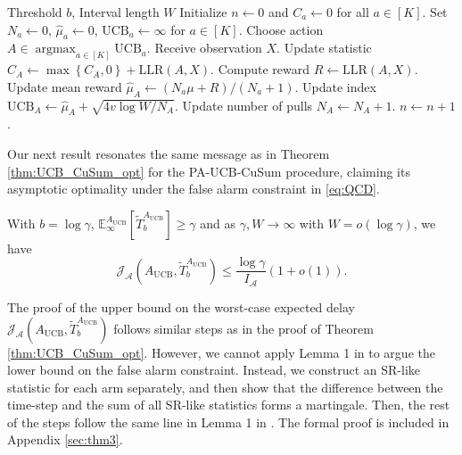 \documentclass[letterpaper, 10 pt, conference]{ieeeconf}  %
\newcommand{\lp}{\left(}
\newcommand{\rp}{\right)}
\newcommand{\lb}{\left[}
\newcommand{\rb}{\right]}
\newcommand{\lbp}{\left\{}
\newcommand{\rbp}{\right\}}
\newcommand{\mcal}{\mathcal}
\newcommand{\mrm}{\mathrm}
\newcommand{\E}{\mathbb{E}}
\newcommand{\argmax}{\mathop{\mathrm{argmax}}}
\begin{document}
\begin{algorithm}[htb]
  \caption{PA-UCB-CuSum Procedure}
  \label{alg:PA_UCB_CuSum}
  \begin{algorithmic}
     Threshold $b$, Interval length $W$
    \STATE Initialize $n \leftarrow 0$ and $C_{a} \leftarrow 0$ for all $a \in \lb K \rb$.
    \REPEAT
    \STATE Set $N_{a} \leftarrow 0$, $\hat{\mu}_{a} \leftarrow 0$, $\mrm{UCB}_{a} \leftarrow \infty$ for $a \in \lb K \rb$.
    \ENDIF
    \STATE Choose action $A \in \argmax_{a \in \lb K \rb} \mrm{UCB}_{a}$.
    \STATE Receive observation $X$.
    \STATE Update statistic $C_{A} \leftarrow \max\lbp C_{A}, 0 \rbp + \mrm{LLR}\lp A, X \rp$.
    \STATE Compute reward $R \leftarrow \mrm{LLR} \lp A, X \rp$.
    \STATE Update mean reward $\hat{\mu}_{A} \leftarrow \lp N_{a} \mu + R \rp/\lp N_{a} + 1 \rp$.
    \STATE Update index $\mrm{UCB}_{A} \leftarrow \hat{\mu}_{A} + \sqrt{4v\log W/N_{A}}$.
    \STATE Update number of pulls $N_{A} \leftarrow N_{A} + 1$.
    \STATE $n \leftarrow n + 1$.
    \UNTIL{$C_{a} \geq b$ for some $a \in \lb K \rb$}
  \end{algorithmic}
\end{algorithm}

Our next result resonates the same message as in Theorem \ref{thm:UCB_CuSum_opt} for the PA-UCB-CuSum procedure, claiming its asymptotic optimality under the false alarm constraint in \eqref{eq:QCD}.
%
\begin{theorem}\label{thm:PA_UCB_CuSum_opt}
With $b = \log \gamma$, $\E_{\infty}^{A_{\mrm{UCB}}} \lb \tilde{T}_{b}^{A_{\mrm{UCB}}} \rb \geq \gamma$ and as $\gamma, W \to \infty$ with $W = o\lp \log \gamma \rp$, we have
%
\begin{equation}\label{eq:thm_PA_WADD}
\mcal{J}_{\mcal{A}} \!\lp \!A_{\mrm{UCB}}, \tilde{T}_{b}^{A_{\mrm{UCB}}} \!\rp \leq \frac{\log\gamma}{I_{\mcal{A}}} \lp 1 + o \lp 1 \rp \rp.
\end{equation}
\end{theorem}
%
\vspace{3pt}
The proof of the upper bound on the worst-case expected delay $\mcal{J}_{\mcal{A}} (A_{\mrm{UCB}}, \tilde{T}^{A_{\mrm{UCB}}}_{b})$ follows similar steps as in the proof of Theorem \ref{thm:UCB_CuSum_opt}. However, we cannot apply Lemma 1 in \cite{veeravalli2024quickest} to argue the lower bound on the false alarm constraint. 
Instead, we construct an SR-like statistic for each arm separately, and then show that the difference between the time-step and the sum of all SR-like statistics forms a martingale. Then, the rest of the steps follow the same line in Lemma 1 in \cite{veeravalli2024quickest}. The formal proof is included in Appendix \ref{sec:thm3}. 
\end{document}
